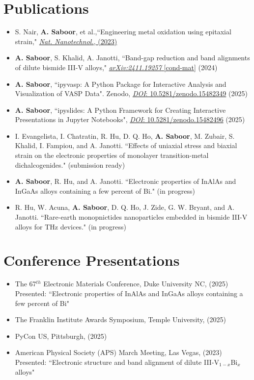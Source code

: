 \documentclass[letter,11pt]{article}
\begin{document}
\section{Publications}
\begin{itemize}
    \item S. Nair, \textbf{A. Saboor}, et al.,``Engineering metal oxidation using epitaxial strain," \href{https://www.nature.com/articles/s41565-023-01397-0}{\textit{Nat. Nanotechnol.}, (2023)}
    \item \textbf{A. Saboor}, S. Khalid, A. Janotti, ``Band-gap reduction and band alignments of dilute bismide III-V alloys," \href{https://arxiv.org/abs/2411.19257}{\textit{arXiv:2411.19257} [cond-mat]} (2024)
    \item \textbf{A. Saboor}, ``ipyvasp: A Python Package for Interactive Analysis and Visualization of VASP Data". Zenodo, \href{https://zenodo.org/records/15482349}{\textit{DOI}: 10.5281/zenodo.15482349} (2025)
    \item \textbf{A. Saboor}, ``ipyslides: A Python Framework for Creating Interactive Presentations in Jupyter Notebooks", \href{https://zenodo.org/records/15482496}{\textit{DOI}: 10.5281/zenodo.15482496} (2025)
    \item I. Evangelista, I. Chatratin, R. Hu, D. Q. Ho, \textbf{A. Saboor}, M. Zubair, S. Khalid, I. Fampiou, and A. Janotti. ``Effects of uniaxial stress and biaxial strain on the electronic properties of
        monolayer transition-metal dichalcogenides." (submission ready)
    \item \textbf{A. Saboor}, R. Hu, and A. Janotti. ``Electronic properties of InAlAs and InGaAs alloys containing a few percent of Bi." (in progress)
    \item R. Hu, W. Acuna, \textbf{A. Saboor}, D. Q. Ho, J. Zide, G. W. Bryant, and A. Janotti. ``Rare-earth monopnictides nanoparticles embedded in bismide III-V alloys for THz devices." (in progress)
\end{itemize}

\section{Conference Presentations}
\begin{itemize}
    \item The 67$^{th}$ Electronic Materials Conference, Duke University NC, (2025) \\
      Presented: ``Electronic properties of InAlAs and InGaAs alloys containing a few percent of Bi"
    \item The Franklin Institute Awards Symposium, Temple University, (2025)
    \item PyCon US, Pittsburgh, (2025)
    \item American Physical Society (APS) March Meeting, Las Vegas, (2023) \\
      Presented: ``Electronic structure and band alignment of dilute III-V$_{1-x}$Bi$_x$ alloys"
\end{itemize}
\end{document}
